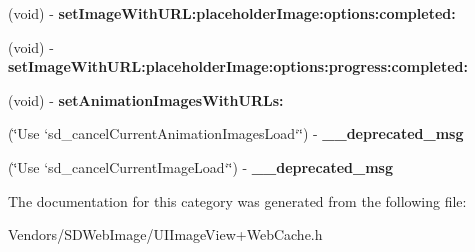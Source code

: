 \begin{DoxyCompactItemize}
\item 
\hypertarget{category_u_i_image_view_07_web_cache_deprecated_08_a92975ceb945eb09e04d559a4aca12e95}{}(void) -\/ {\bfseries set\+Image\+With\+U\+R\+L\+:placeholder\+Image\+:options\+:completed\+:}\label{category_u_i_image_view_07_web_cache_deprecated_08_a92975ceb945eb09e04d559a4aca12e95}

\item 
\hypertarget{category_u_i_image_view_07_web_cache_deprecated_08_aac9a43c748b4371e14fb6781885079ce}{}(void) -\/ {\bfseries set\+Image\+With\+U\+R\+L\+:placeholder\+Image\+:options\+:progress\+:completed\+:}\label{category_u_i_image_view_07_web_cache_deprecated_08_aac9a43c748b4371e14fb6781885079ce}

\item 
\hypertarget{category_u_i_image_view_07_web_cache_deprecated_08_acdd947fd7a465af1177ae2685f7df4c8}{}(void) -\/ {\bfseries set\+Animation\+Images\+With\+U\+R\+Ls\+:}\label{category_u_i_image_view_07_web_cache_deprecated_08_acdd947fd7a465af1177ae2685f7df4c8}

\item 
\hypertarget{category_u_i_image_view_07_web_cache_deprecated_08_ac76fd2691079d4ecf8e24913a99ceb60}{}(\char`\"{}Use `sd\+\_\+cancel\+Current\+Animation\+Images\+Load`\char`\"{}) -\/ {\bfseries \+\_\+\+\_\+deprecated\+\_\+msg}\label{category_u_i_image_view_07_web_cache_deprecated_08_ac76fd2691079d4ecf8e24913a99ceb60}

\item 
\hypertarget{category_u_i_image_view_07_web_cache_deprecated_08_a0184d8f358c9009de3cf96d844df495b}{}(\char`\"{}Use `sd\+\_\+cancel\+Current\+Image\+Load`\char`\"{}) -\/ {\bfseries \+\_\+\+\_\+deprecated\+\_\+msg}\label{category_u_i_image_view_07_web_cache_deprecated_08_a0184d8f358c9009de3cf96d844df495b}

\end{DoxyCompactItemize}


The documentation for this category was generated from the following file\+:\begin{DoxyCompactItemize}
\item 
Vendors/\+S\+D\+Web\+Image/U\+I\+Image\+View+\+Web\+Cache.\+h\end{DoxyCompactItemize}
